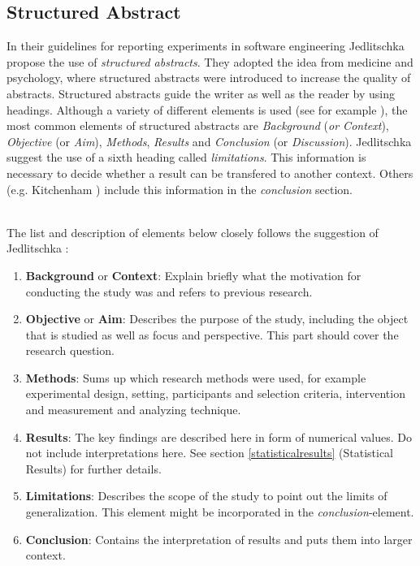 
\subsection{Structured Abstract}
\label{subsec:structured abstract}

In their guidelines for reporting experiments in software engineering Jedlitschka \etal \cite{Jedlitschka2008} propose the use of \emph{structured abstracts}. They adopted the idea from medicine and psychology, where structured abstracts were introduced to increase the quality of abstracts. Structured abstracts guide the writer as well as the reader by using headings. Although a variety of different elements is used (see for example ), the most common elements of structured abstracts are \emph{Background} (\emph{or Context}), \emph{Objective} (or \emph{Aim}), \emph{Methods}, \emph{Results} and \emph{Conclusion} (or \emph{Discussion}). Jedlitschka \etal \cite{Jedlitschka2008} suggest the use of a sixth heading called \emph{limitations}. This information is necessary to decide whether a result can be transfered to another context. Others (e.g. Kitchenham \etal \cite{KBO2008}) include this information in the \emph{conclusion} section.

\\
The list and description of elements below closely follows the suggestion of Jedlitschka \etal \cite{Jedlitschka2008}:
\begin{enumerate}
	\item \textbf{Background} or \textbf{Context}: Explain briefly what the motivation for conducting the study was and refers to previous research.
	\item \textbf{Objective} or \textbf{Aim}: Describes the purpose of the study, including the object that is studied as well as focus and perspective. This part should cover the research question.
	\item \textbf{Methods}: Sums up which research methods were used, for example experimental design, setting, participants and selection criteria, intervention and measurement and analyzing technique.
	\item \textbf{Results}: The key findings are described here in form of numerical values. Do not include interpretations here. See section \ref{statisticalresults} (Statistical Results) for further details.
	\item \textbf{Limitations}: Describes the scope  of the study to point out the limits of generalization. This element might be incorporated in the \emph{conclusion}-element.
	\item \textbf{Conclusion}:  Contains the interpretation of results and puts them into larger context.
\end{enumerate}

